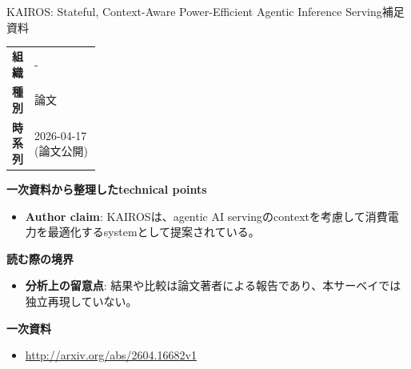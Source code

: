 \begin{technicalnote}{KAIROS: Stateful, Context-Aware Power-Efficient Agentic Inference Serving}{補足資料}
\begingroup
\begin{tabularx}{\linewidth}{@{}>{\bfseries}p{0.22\linewidth}X@{}}
組織 & - \\
種別 & 論文 \\
時系列 & 2026-04-17 (論文公開) \\
\end{tabularx}
\smallskip
{\bfseries 一次資料から整理したtechnical points}
\begin{itemize}[leftmargin=1.5em,itemsep=0.35em]
\item \textbf{Author claim}: KAIROSは、agentic AI servingのcontextを考慮して消費電力を最適化するsystemとして提案されている。
\end{itemize}
\begin{minipage}{\linewidth}
{\bfseries 読む際の境界}
\begin{itemize}[leftmargin=1.5em,itemsep=0.35em]
\item \textbf{分析上の留意点}: 結果や比較は論文著者による報告であり、本サーベイでは独立再現していない。
\end{itemize}
\begin{samepage}
{\bfseries 一次資料}
\begingroup\sloppy
\begin{itemize}[leftmargin=1.5em,itemsep=0.25em]
\item {\scriptsize\url{http://arxiv.org/abs/2604.16682v1}}
\end{itemize}
\endgroup
\end{samepage}
\end{minipage}
\endgroup
\end{technicalnote}
\medskip

